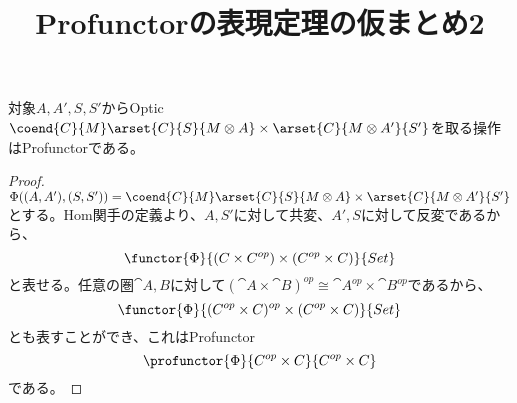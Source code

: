\documentclass[uplatex,dvipdfmx]{jsarticle}
\begin{document}
  \title{Profunctorの表現定理の仮まとめ2}
  \maketitle
  \begin{prop}
    対象$A,A',S,S'$からOptic $\coend{C}{M}\arset{C}{S}{M\otimes A}\times\arset{C}{M\otimes A'}{S'}$を取る操作はProfunctorである。
  \end{prop}
  \begin{proof}
    $\Phi((A,A'),(S,S'))=\coend{C}{M}\arset{C}{S}{M\otimes A}\times\arset{C}{M\otimes A'}{S'}$とする。Hom関手の定義より、$A,S'$に対して共変、$A',S$に対して反変であるから、\[\functor{\Phi}{(C\times C^{op})\times (C^{op}\times C)}{Set}\]と表せる。任意の圏$\cat{A,B}$に対して$(\cat{A}\times \cat{B})^{op}\cong \cat{A}^{op}\times \cat{B}^{op}$であるから、\[\functor{\Phi}{(C^{op}\times C)^{op}\times (C^{op}\times C)}{Set}\]とも表すことができ、これはProfunctor\[\profunctor{\Phi}{C^{op}\times C}{C^{op}\times C}\]である。
  \end{proof}
\end{document}
